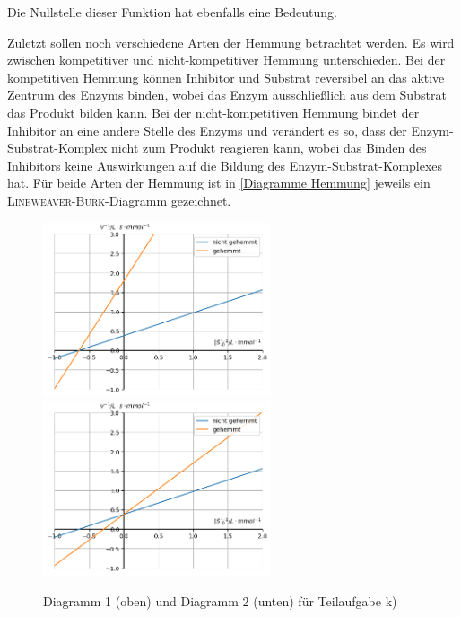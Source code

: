 \documentclass[../kl11.tex]{subfiles}
\begin{document}
\newpage

Die Nullstelle dieser Funktion hat ebenfalls eine Bedeutung.


Zuletzt sollen noch verschiedene Arten der Hemmung betrachtet werden. Es wird zwischen kompetitiver und nicht-kompetitiver Hemmung unterschieden. Bei der kompetitiven Hemmung können Inhibitor und Substrat reversibel an das aktive Zentrum des Enzyms binden, wobei das Enzym ausschließlich aus dem Substrat das Produkt bilden kann. Bei der nicht-kompetitiven Hemmung bindet der Inhibitor an eine andere Stelle des Enzyms und verändert es so, dass der Enzym-Substrat-Komplex nicht zum Produkt reagieren kann, wobei das Binden des Inhibitors keine Auswirkungen auf die Bildung des Enzym-Substrat-Komplexes hat. Für beide Arten der Hemmung ist  in \autoref{Diagramme Hemmung} jeweils ein \textsc{Lineweaver-Burk}-Diagramm gezeichnet.
\begin{figure}[H]
\centering
\includegraphics[width=0.6\textwidth]{2024/Abbildungen/Kinetik/Diagramm_1_Süßmaus.png}
\includegraphics[width=0.6\textwidth]{2024/Abbildungen/Kinetik/Diagramm_2_Süßmaus.png}
\caption{Diagramm 1 (oben) und Diagramm 2 (unten) für Teilaufgabe k)}
\label{Diagramme Hemmung}
\end{figure}
\end{document}
